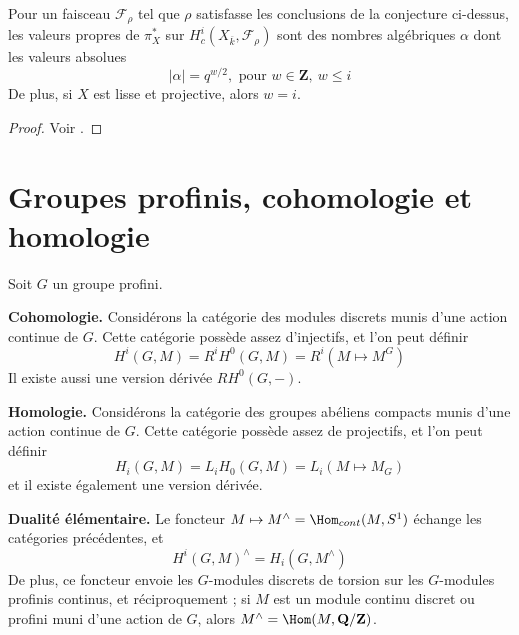 \begin{theorem}
\label{theorem-weil-II}
Pour un faisceau
$\mathcal{F}_\rho$ tel que $\rho$ satisfasse les conclusions de la conjecture
ci-dessus, les valeurs propres de $\pi_X^*$ sur $H_c^i(X_{\overline{k}},
\mathcal{F}_{\rho})$ sont des nombres algébriques $\alpha$ dont les valeurs absolues
$$
|\alpha|=q^{w/2}, \text{ pour }w\in \mathbf{Z},\ w\leq i
$$
De plus, si $X$ est lisse et projective, alors $w = i$.
\end{theorem}

\begin{proof}
Voir \cite{WeilII}.
\end{proof}




\section{Groupes profinis, cohomologie et homologie}
\label{section-profinite-cohomology}

\noindent
Soit $G$ un groupe profini.

\medskip\noindent
{\bf Cohomologie.}
Considérons la catégorie des modules discrets munis d'une action continue de $G$.
Cette catégorie possède assez d'injectifs, et l'on peut définir
$$
H^i(G, M) = R^iH^0(G, M) = R^i(M\mapsto M^G)
$$
Il existe aussi une version dérivée $RH^0(G, -)$.

\medskip\noindent
{\bf Homologie.}
Considérons la catégorie des groupes abéliens compacts munis d'une action continue de $G$.
Cette catégorie possède assez de projectifs, et l'on peut définir
$$
H_i(G, M) = L_iH_0(G, M)=L_i(M\mapsto M_G)
$$
et il existe également une version dérivée.

\medskip\noindent
{\bf Dualité élémentaire.}
Le foncteur $M\mapsto M^\wedge = \Hom_{cont}(M, S^1)$
échange les catégories précédentes, et
$$
H^i(G, M)^\wedge = H_i(G, M^\wedge)
$$
De plus, ce foncteur envoie les $G$-modules discrets de torsion sur les
$G$-modules profinis continus, et réciproquement ; si $M$ est un module continu
discret ou profini muni d'une action de $G$, alors
$M^\wedge = \Hom(M, \mathbf{Q}/\mathbf{Z})$.

